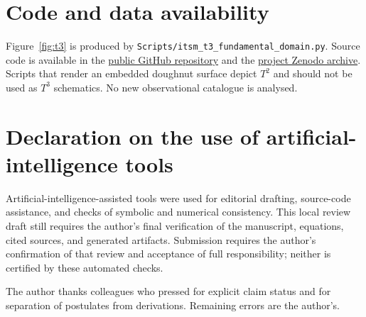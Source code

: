 \documentclass[aps,prd,reprint,superscriptaddress,nofootinbib,floatfix,showkeys]{revtex4-2}
\newcommand{\Tthree}{T^{3}}
\newcommand{\Ttwo}{T^{2}}
\begin{document}
\section*{Code and data availability}

\begingroup
\raggedright
Figure~\ref{fig:t3} is produced by
\texttt{Scripts/itsm\_t3\_fundamental\_domain.py}.
Source code is available in the
\href{https://github.com/brendohxd/ITSM-Integrated-Toroidal-Syntropic-Model}{public GitHub repository}
and the \href{https://doi.org/10.5281/zenodo.18808348}{project Zenodo archive}.
Scripts that render an embedded doughnut surface depict \(\Ttwo\) and should
not be used as \(\Tthree\) schematics.  No new observational catalogue is
analysed.
\par
\endgroup

\section*{Declaration on the use of artificial-intelligence tools}

Artificial-intelligence-assisted tools were used for editorial drafting,
source-code assistance, and checks of symbolic and numerical consistency.
This local review draft still requires the author's final verification of
the manuscript, equations, cited sources, and generated artifacts. Submission
requires the author's confirmation of that review and acceptance of full
responsibility; neither is certified by these automated checks.

\begin{acknowledgments}
The author thanks colleagues who pressed for explicit claim status and for
separation of postulates from derivations.  Remaining errors are the author's.
\end{acknowledgments}


\end{document}

